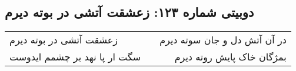 \begin{center}
\section*{دوبیتی شماره ۱۲۳: زعشقت آتشی در بوته دیرم}
\label{sec:123}
\begin{longtable}{l p{0.5cm} r}
زعشقت آتشی در بوته دیرم
&&
در آن آتش دل و جان سوته دیرم
\\
سگت ار پا نهد بر چشمم ایدوست
&&
بمژگان خاک پایش روته دیرم
\\
\end{longtable}
\end{center}
